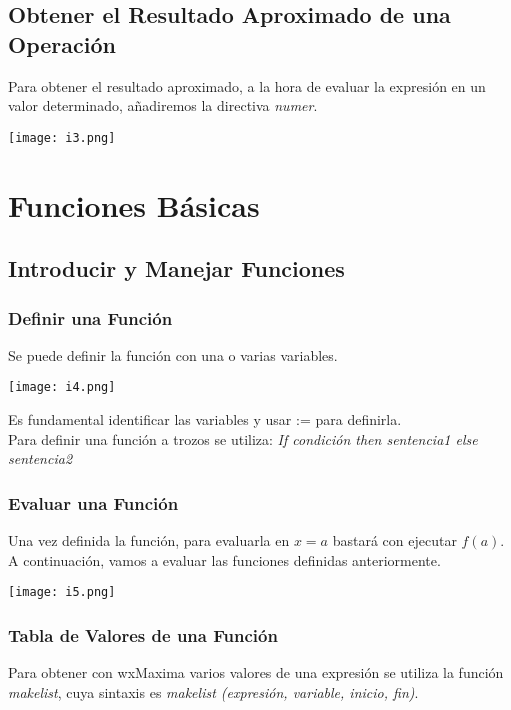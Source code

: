 \documentclass[12pt]{article}
\begin{document}
\subsection*{Obtener el Resultado Aproximado de una Operación}
Para obtener el resultado aproximado, a la hora de evaluar la expresión en un valor
determinado, añadiremos la directiva \textit{ numer}.

\begin{center}
    \texttt{[image: i3.png]}\\
\end{center}

\section*{Funciones Básicas}
\subsection*{Introducir y Manejar Funciones}
\subsubsection*{Definir una Función}
Se puede definir la función con una o varias variables.

\begin{center}
    \texttt{[image: i4.png]}\\
\end{center}

Es fundamental identificar las variables y usar := para definirla.\\
Para definir una función a trozos se utiliza: \textit{If condición then sentencia1 else sentencia2}

\subsubsection*{Evaluar una Función}
Una vez definida la función, para evaluarla en $x = a$ bastará con ejecutar $f(a)$. A continuación, vamos a evaluar las funciones definidas anteriormente.

\begin{center}
    \texttt{[image: i5.png]}\\
\end{center}

\subsubsection*{Tabla de Valores de una Función}
Para obtener con wxMaxima varios valores de una expresión se utiliza la función \textit{makelist}, cuya sintaxis es \textit{makelist (expresión, variable, inicio, fin)}.\\
\end{document}
